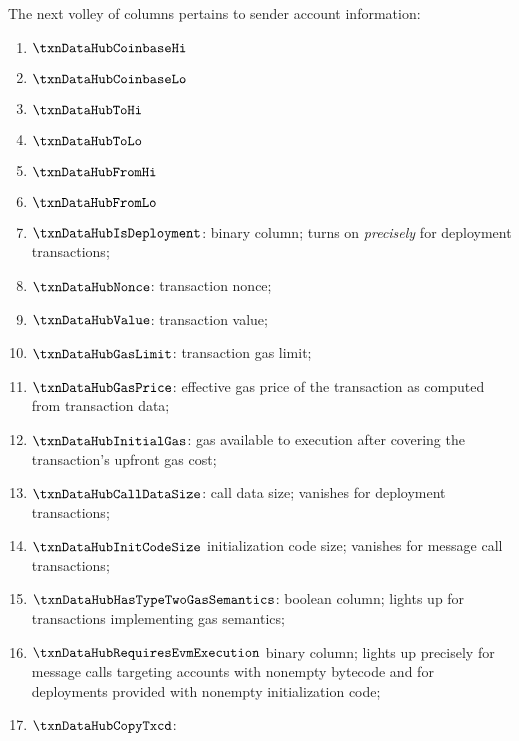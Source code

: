 The next volley of columns pertains to sender account information:
\begin{enumerate}
	\item
		\markAsExtractedFromBtc{}
		$\txnDataHubCoinbaseHi$
	\item
		\markAsExtractedFromBtc{}
		$\txnDataHubCoinbaseLo$
	\item
		\markAsExtractedFromRlpTxn{}
		\markAsExtractedFromRlpAddr{}
		$\txnDataHubToHi$
	\item
		\markAsExtractedFromRlpTxn{}
		\markAsExtractedFromRlpAddr{}
		$\txnDataHubToLo$
	\item
		\markAsExtractedFromEcrecover{}
		$\txnDataHubFromHi$
	\item
		\markAsExtractedFromEcrecover{}
		$\txnDataHubFromLo$
	\item
		\markAsExtractedFromRlpTxn{}
		$\txnDataHubIsDeployment$:
		binary column;
		turns on \emph{precisely} for deployment transactions;
	\item
		\markAsExtractedFromRlpTxn{}
		$\txnDataHubNonce$:
		transaction nonce;
	\item
		\markAsExtractedFromRlpTxn{}
		$\txnDataHubValue$:
		transaction value;
	\item
		\markAsExtractedFromRlpTxn{}
		$\txnDataHubGasLimit$:
		transaction gas limit;
	\item
		\markAsJustifiedHere{}
		$\txnDataHubGasPrice$:
		effective gas price of the transaction as computed from transaction data;
	\item
		\markAsJustifiedHere{}
		$\txnDataHubInitialGas$:
		gas available to \evm{} execution after covering the transaction's upfront gas cost;
	\item
		\markAsJustifiedHere{}
		$\txnDataHubCallDataSize$:
		call data size;
		vanishes for deployment transactions;
	\item
		\markAsJustifiedHere{}
		$\txnDataHubInitCodeSize$
		initialization code size;
		vanishes for message call transactions;
	\item
		\markAsJustifiedHere{}
		$\txnDataHubHasTypeTwoGasSemantics$:
		boolean column;
		lights up for transactions implementing \cite{EIP-1559} gas semantics;
	\item
		\markAsPartiallyJustifiedHere{}
		$\txnDataHubRequiresEvmExecution$
		binary column;
		lights up precisely for message calls targeting accounts with nonempty bytecode
		and for deployments provided with nonempty initialization code;
	\item
		\markAsJustifiedHere{}
		$\txnDataHubCopyTxcd$:

\end{enumerate}
